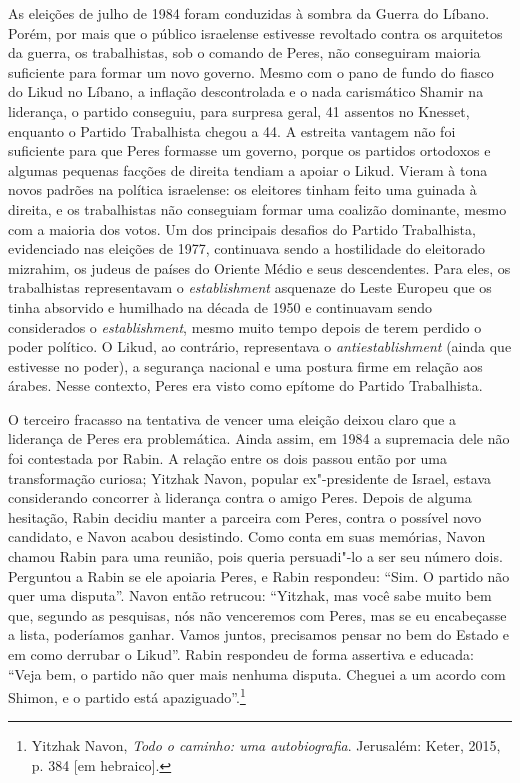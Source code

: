 As eleições de julho de 1984 foram conduzidas à sombra da Guerra do
Líbano. Porém, por mais que o público israelense estivesse revoltado
contra os arquitetos da guerra, os trabalhistas, sob o comando de Peres,
não conseguiram maioria suficiente para formar um novo governo. Mesmo
com o pano de fundo do fiasco do Likud no Líbano, a inflação
descontrolada e o nada carismático Shamir na liderança, o partido
conseguiu, para surpresa geral, 41 assentos no Knesset,
enquanto o Partido Trabalhista chegou a 44. A estreita
vantagem não foi suficiente para que Peres formasse um governo, porque
os partidos ortodoxos e algumas pequenas facções de direita tendiam a
apoiar o Likud. Vieram à tona novos padrões na política israelense: os
eleitores tinham feito uma guinada à direita, e os trabalhistas não
conseguiam formar uma coalizão dominante, mesmo com a maioria dos votos.
Um dos principais desafios do Partido Trabalhista, evidenciado nas
eleições de 1977, continuava sendo a hostilidade do eleitorado
mizrahim, os judeus de países do Oriente Médio e seus descendentes. Para
eles, os trabalhistas representavam o \textit{establishment} asquenaze do
Leste Europeu que os tinha absorvido e humilhado na década de 1950 e
continuavam sendo considerados o \textit{establishment}, mesmo muito tempo depois
de terem perdido o poder político. O Likud, ao contrário, representava o
\textit{antiestablishment} (ainda que estivesse no poder), a segurança nacional e uma
postura firme em relação aos árabes. Nesse contexto, Peres era visto
como epítome do Partido Trabalhista.

O terceiro fracasso na tentativa de vencer uma eleição deixou claro que
a liderança de Peres era problemática. Ainda assim, em 1984 a supremacia
dele não foi contestada por Rabin. A relação entre os dois passou então
por uma transformação curiosa; Yitzhak Navon, popular ex"-presidente de
Israel, estava considerando concorrer à liderança contra o amigo Peres.
Depois de alguma hesitação, Rabin decidiu manter a parceira com Peres,
contra o possível novo candidato, e Navon acabou desistindo. Como conta
em suas memórias, Navon chamou Rabin para uma reunião, pois queria
persuadi"-lo a ser seu número dois. Perguntou a Rabin se ele apoiaria
Peres, e Rabin respondeu: ``Sim. O partido não quer uma disputa''. Navon
então retrucou: ``Yitzhak, mas você sabe muito bem que, segundo as
pesquisas, nós não venceremos com Peres, mas se eu encabeçasse a lista,
poderíamos ganhar. Vamos juntos, precisamos pensar no bem do Estado e em
como derrubar o Likud''. Rabin respondeu de forma assertiva e educada:
``Veja bem, o partido não quer mais nenhuma disputa. Cheguei a um acordo
com Shimon, e o partido está apaziguado''.\footnote{Yitzhak Navon,
  \textit{Todo o caminho: uma autobiografia}. Jerusalém: Keter, 2015, p. 384
  {[}em hebraico{]}.}

